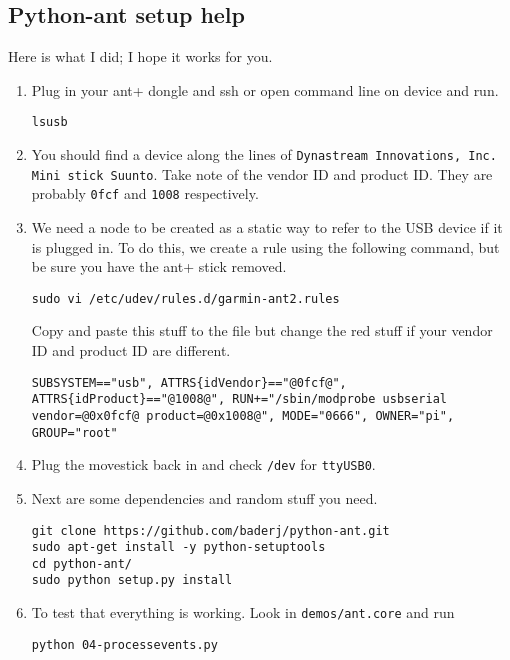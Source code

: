\documentclass[letterpaper]{article}
\begin{document}
\subsection{Python-ant setup help}
Here is what I did; I hope it works for you. 
\begin{enumerate}
   \item Plug in your ant+ dongle and ssh or open command line on device and run. 
      \begin{lstlisting}[frame=single,style=base]
lsusb
      \end{lstlisting}
   \item You should find a device along the lines of \texttt{Dynastream Innovations, Inc. Mini stick Suunto}. Take note of the vendor ID and product ID. They are probably \texttt{0fcf} and \texttt{1008} respectively. 
   \item We need a node to be created as a static way to refer to the USB device if it is plugged in. To do this, we create a rule using the following command, but be sure you have the ant+ stick removed. 
   \begin{lstlisting}[frame=single,style=base]
sudo vi /etc/udev/rules.d/garmin-ant2.rules
   \end{lstlisting}
   Copy and paste this stuff to the file but change the red stuff if your vendor ID and product ID are different.
   \begin{lstlisting}[frame=single,style=base]
SUBSYSTEM=="usb", ATTRS{idVendor}=="@0fcf@", ATTRS{idProduct}=="@1008@", RUN+="/sbin/modprobe usbserial vendor=@0x0fcf@ product=@0x1008@", MODE="0666", OWNER="pi", GROUP="root"
   \end{lstlisting}
   \item Plug the movestick back in and check \texttt{/dev} for \texttt{ttyUSB0}.
   \item Next are some dependencies and random stuff you need. 
   \begin{lstlisting}[frame=single,style=base]
git clone https://github.com/baderj/python-ant.git
sudo apt-get install -y python-setuptools
cd python-ant/
sudo python setup.py install
   \end{lstlisting}
   \item To test that everything is working. Look in \texttt{demos/ant.core} and run 
   \begin{lstlisting}[frame=single,style=base]
python 04-processevents.py 
   \end{lstlisting}


\end{enumerate}
      
\end{document}
